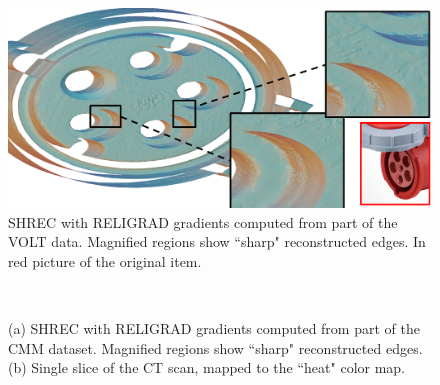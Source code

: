 \begin{figure}[t]
\centering
	\includegraphics[width=\linewidth]{images/volt.eps}
	\caption{SHREC with RELIGRAD gradients computed from part of the VOLT data. Magnified regions show ``sharp" reconstructed edges. In red picture of the original item.}
	\label{fig:ict:volt}
\end{figure}

\begin{figure}[t]
	\centering
	\\
	\caption{(a) SHREC with RELIGRAD gradients computed from part of the CMM dataset. Magnified regions show ``sharp" reconstructed edges. (b) Single slice of the CT scan, mapped to the ``heat" color map.}\label{fig:ict:CMM}
\end{figure}

